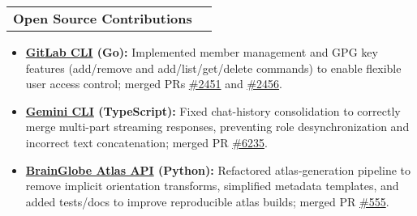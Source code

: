 \documentclass[letterpaper,11pt]{article}
\makeatletter
\newcommand{\resumeItem}[1]{
  \item\small{
    {#1 \vspace{-2pt}}
  }
}
\newcommand{\resumeProjectHeading}[2]{
    \item
    \begin{tabular*}{\textwidth}{l@{\extracolsep{\fill}}r}
      \small#1 & #2 \\
    \end{tabular*}\vspace{-7pt}
}
\newcommand{\resumeItemListStart}{\begin{itemize}[leftmargin=0.15in]}
\newcommand{\resumeItemListEnd}{\end{itemize}\vspace{-5pt}}
\makeatother
\begin{document}
\resumeProjectHeading
{\textbf{Open Source Contributions}}{}
\resumeItemListStart
\resumeItem{\textbf{\href{https://gitlab.com/gitlab-org/cli}{GitLab CLI} (Go):} Implemented member management and GPG key features (add/remove and add/list/get/delete commands) to enable flexible user access control; merged PRs \href{https://gitlab.com/gitlab-org/cli/-/merge_requests/2451}{\#2451} and \href{https://gitlab.com/gitlab-org/cli/-/merge_requests/2456}{\#2456}.}
\resumeItem{\textbf{\href{https://github.com/google-gemini/gemini-cli}{Gemini CLI} (TypeScript):} Fixed chat-history consolidation to correctly merge multi-part streaming responses, preventing role desynchronization and incorrect text concatenation; merged PR \href{https://github.com/google-gemini/gemini-cli/pull/6235}{\#6235}.}
\resumeItem{\textbf{\href{https://github.com/brainglobe/brainglobe-atlasapi}{BrainGlobe Atlas API} (Python):} Refactored atlas-generation pipeline to remove implicit orientation transforms, simplified metadata templates, and added tests/docs to improve reproducible atlas builds; merged PR \href{https://github.com/brainglobe/brainglobe-atlasapi/pull/555}{\#555}.}
\resumeItemListEnd

\end{document}
